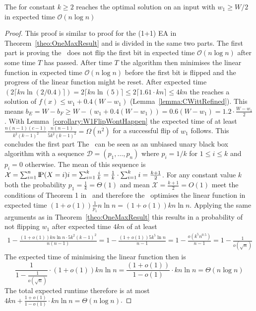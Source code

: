 \begin{lemma}\label{lemma:RLSRoneMaxInput}
    The \RLSR[k] for constant $k\ge2$ reaches the optimal solution on an input with $w_1\ge W/2$ in expected time $\mathcal{O}(n\log{}n)$
\end{lemma}
\begin{proof}
    This proof is similar to proof for the (1+1) EA in Theorem~\ref{theo:OneMaxResult} and is divided in the same two parts.
    The first part is proving the \RLSR~does not flip the first bit in expected time $\mathcal{O}(n\log{}n)$ after some time $T$ has passed.
    After time $T$ the algorithm then minimises the linear function in expected time $\mathcal{O}(n\log{}n)$ before the first bit is flipped and the progress of the linear function might be reset.
    After expected time $(2\lceil kn\ln(2/0.4)\rceil)=2\lceil kn\ln(5)\rceil\le2\lceil 1.61\cdot kn\rceil\le4kn$ the \RLSR[k] reaches a solution of \(f(x)\le w_1+0.4(W-w_1)\) (Lemma~\ref{lemma:CWittRefined}).
    This means \(b_E=W-b_F\ge W-(w_1+0.4(W-w_1)) = 0.6(W-w_1) = 1.2\cdot\frac{W-w_1}{2}\).
    With Lemma~\ref{corollary:W1FlipWontHappen} the expected time of at least \(\frac{n(n-1)(c-1)}{k^2{(k-1)}^2}\frac{n(n-1)}{5k^2{(k-1)}^2}=\Omega(n^2)\) for a successful flip of $w_1$ follows. This concludes the first part\newline
    The \RLSR~can be seen as an unbiased unary black box algorithm with a sequence $\mathcal{D}=(p_1,\dots,p_n)$ where $p_i=1/k$ for $1\le i\le k$ and $p_i=0$ otherwise.
    The mean of this sequence is \(\mathcal{X}=\sum_{i=1}^{n}{\text{I\kern-0.15em P}(X=i)i}=\sum_{i=1}^{k}{\frac{i}{k}}=\frac{1}{k}\cdot\sum_{i=1}^{k}{i}=\frac{k+1}{2}\).
    For any constant value $k$ both the probability $p_1=\frac{1}{k}=\Theta(1)$ and mean $\mathcal{X}=\frac{k+1}{2}=O(1)$ meet the conditions of Theorem 1 in~\cite{doerr2023tight} and therefore the \RLSR~optimises the linear function in expected time \((1+o(1))\frac{1}{p_1}n\ln n=(1+o(1))kn\ln n\).
    Applying the same arguments as in Theorem~\ref{theo:OneMaxResult} this results in a probability of not flipping $w_1$ after expected time $4kn$ of at least
    \begin{gather}\nonumber
        1-\frac{(1+o(1))kn\ln n\cdot5k^2{(k-1)}^2}{n(n-1)}
        =1-\frac{(1+o(1))5k^5\ln n}{n-1}
        =1-\frac{o(k^5n^{0.5})}{n-1}
        =1-\frac{1}{o(\sqrt{n})}
    \end{gather}
    The expected time of minimising the linear function then is
    \[
        \frac{1}{1-\frac{1}{o(\sqrt{n})}}\cdot(1+o(1))kn\ln n
        =\frac{(1+o(1))}{1-o(1)}\cdot kn\ln n=\Theta(n\log{}n)
    \]
    The total expected runtime therefore is at most $4kn+\frac{1+o(1)}{1-o(1)}\cdot kn\ln n=\Theta(n\log{}n)$.
\end{proof}

